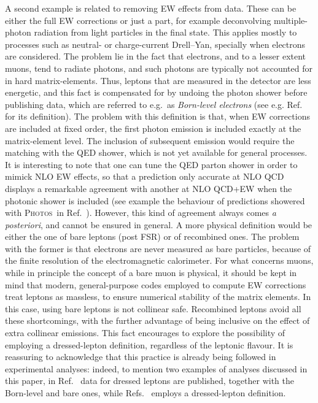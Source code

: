 
A second example is related to removing EW effects from data. These can be either the full EW corrections
or just a part, for example deconvolving multiple-photon radiation from light particles in the final state. This applies mostly
to processes such as neutral- or charge-current Drell--Yan, specially when electrons are considered. The problem lie in the fact that
 electrons, and to a lesser extent muons, tend to radiate photons, and such photons are typically not accounted
for in hard matrix-elements. Thus, leptons that are measured in the detector are less energetic, and this fact is compensated for
by undoing the photon shower before publishing data, which are referred to e.g.\ as \emph{Born-level electrons} (see e.g. Ref.~\cite{Aad:2015auj} for
its definition). The problem with this definition is that, when EW corrections
are included at fixed order, the first photon emission is included exactly at the matrix-element level. The inclusion of 
subsequent emission would require the matching with the QED shower, which is not yet available for general processes. It is interesting
to note that one can tune the QED parton shower in order to mimick NLO EW effects, so that a prediction only accurate at NLO
QCD displays a remarkable agreement with another at NLO QCD+EW when the photonic shower is included (see example the behaviour of predictions showered with
\textsc{Photos}~\cite{Barberio:1990ms,Barberio:1993qi,Golonka:2005pn}in Ref.~\cite{CarloniCalame:2016ouw}). However, this kind of agreement
always comes \emph{a posteriori}, and cannot be ensured in general. A more physical definition would be either the one of bare leptons (post FSR)
or of recombined ones. The problem with the former is that 
electrons are never measured as bare particles, because of the finite resolution 
of the electromagnetic calorimeter. For what concerns muons, while in principle the concept of a bare muon is physical, it should be kept in 
mind that modern, general-purpose codes employed to
compute EW corrections treat leptons as massless, to ensure numerical stability of the matrix elements. In this case, using bare leptons is not collinear safe. Recombined
leptons avoid all these shortcomings, with the further advantage of being 
inclusive on the effect of extra collinear emissions. This fact encourages to explore the possibility of employing a dressed-lepton
definition, regardless of the leptonic flavour. It is reassuring to acknowledge that this practice is already being followed in experimental analyses:
indeed, to mention two examples of analyses discussed in this paper, in Ref.~\cite{Aad:2015auj} data for dressed leptons are published, together with the Born-level
and bare ones, while Refs.~\cite{Sirunyan:2019bzr} employs a dressed-lepton definition.

